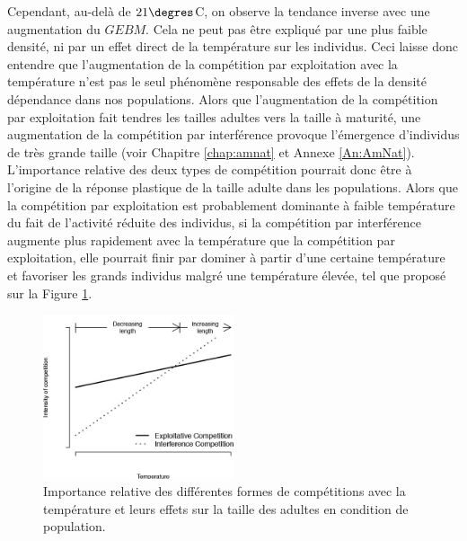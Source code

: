 Cependant, au-delà de $21\degres$C, on observe la tendance inverse avec une
augmentation du $GEBM$. Cela ne peut pas être expliqué par une plus faible
densité, ni par un effet direct de la température sur les individus.
Ceci laisse donc entendre que l'augmentation de la compétition par exploitation
avec la température n'est pas le seul phénomène responsable des effets de la densité
dépendance dans nos populations. Alors que l'augmentation de la compétition par
exploitation fait tendres les tailles adultes vers la taille à maturité,
une augmentation de la compétition par interférence provoque l'émergence
d'individus de très grande taille (voir Chapitre \ref{chap:amnat} et Annexe
\ref{An:AmNat}).
L'importance relative des deux types de compétition pourrait donc être à l'origine de la
réponse plastique de la taille adulte dans les populations. Alors que la
compétition par exploitation est probablement dominante à faible température du
fait de l'activité réduite des individus, si la compétition par interférence
augmente plus rapidement avec la température que la compétition par
exploitation, elle pourrait finir par dominer à partir d'une certaine
température et favoriser les grands individus malgré une
température élevée, tel que proposé sur la Figure \ref{fig:FIP7b}.

\begin{figure}[!ht]
\begin{center}
\includegraphics[width=0.5\textwidth]{1_CorpsDeThese/Resumes/Fig/FIP07b}
\caption[Importance relative
des différentes formes de compétitions]{Importance relative
des différentes formes de compétitions avec la température et leurs effets sur
la taille des adultes en condition de population.}
\label{fig:FIP7b}
\end{center}
\end{figure}

